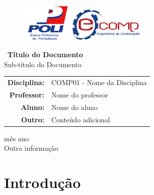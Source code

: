 \documentclass[12pt]{article}
\begin{document}
	\thispagestyle{empty}
	\begin{figure}[!htp]
	    {\includegraphics[scale=0.2, width=2.4cm]{../imagens/poli.png}}\hfill%
	    {\includegraphics[scale=0.3, width=3.7cm]{../imagens/ecomp.png}}%
  	\end{figure}
	\vspace{3.5cm}

	\begin{center}
		\Large{ \ {\bf Título do Documento}}\\[0.2cm]
		\large{Sub-título do Documento}
	\end{center}
	
	\vspace{5cm}
	\begin{center}
		\begin{tabular}{rl}
			{\bf Disciplina:} & {\sf COMP01 - Nome da Disciplina}\\
			{\bf Professor:} & {\sf Nome do professor}\\
			{\bf Aluno:} & {\sf Nome do aluno}\\
			{\bf Outro:} & {\sf Conteúdo adicional}\\
		\end{tabular}
	\end{center}
	\vspace{3.5cm}
	\begin{center}
		{\sc mês ano}\\{\sc Outra informação}\\
	\end{center}
	\newpage

	\tableofcontents
	
	\newpage
	
	\section{Introdução}
\end{document}
